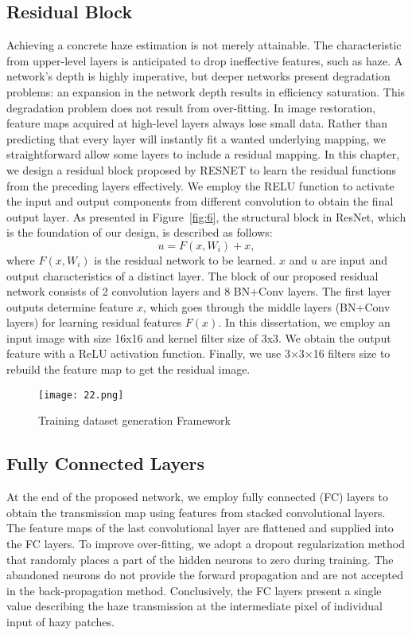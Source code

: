 \documentclass[doctor,english,listoffigures,listoftables]{thesis-uestc}
\begin{document}
\subsection{Residual Block }
Achieving a concrete haze estimation is not merely attainable. The characteristic from upper-level layers is anticipated to drop ineffective features, such as haze. A network's depth is highly imperative, but deeper networks present degradation problems: an expansion in the network depth results in efficiency saturation. This degradation problem does not result from over-fitting. In image restoration, feature maps acquired at high-level layers always lose small data. Rather than predicting that every layer will instantly fit a wanted underlying mapping, we straightforward allow some layers to include a residual mapping. 
In this chapter, we design a residual block proposed by RESNET to learn the residual functions from the preceding layers effectively. We employ the RELU function to activate the input and output components from different convolution to obtain the final output layer. As presented in Figure~\ref{fig:6}, the structural block in ResNet, which is the foundation of our design, is described as follows:
\begin{equation}
	u=F(x,W_i)+x,
\end{equation}
where $F(x, W_i)$ is the residual network to be learned. $x$ and $u$ are input and output characteristics of a distinct layer. The block of our proposed residual network consists of 2 convolution layers and 8 BN+Conv layers. The first layer outputs determine feature $x$, which goes through the middle layers (BN+Conv layers) for learning residual features $F(x)$. In this dissertation, we employ an input image with size 16x16 and kernel filter size of 3x3. We obtain the output feature with a ReLU activation function. Finally, we use 3×3×16 filters size to rebuild the feature map to get the residual image.
\begin{figure}[H]
\texttt{[image: 22.png]}
\caption{Training dataset generation Framework}
\label{fig:8}
\end{figure}
\subsection{Fully Connected Layers}
At the end of the proposed network,  we employ fully connected  (FC)  layers to obtain the transmission map using features from stacked convolutional layers.  The feature maps of the last convolutional layer are flattened and supplied into the FC layers. To improve over-fitting, we adopt a dropout regularization method that randomly places a part of the hidden neurons to zero during training.  The abandoned neurons do not provide the forward propagation and are not accepted in the back-propagation method. Conclusively, the FC layers present a single value describing the haze transmission at the intermediate pixel of individual input of hazy patches.   
\end{document}
